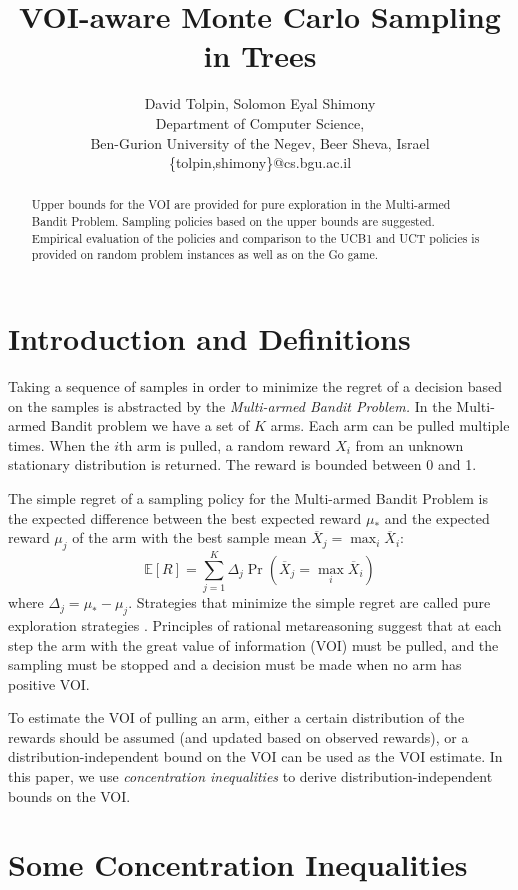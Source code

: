 \documentclass{article}
\title{VOI-aware Monte Carlo Sampling in Trees}
\author {David Tolpin, Solomon Eyal Shimony \\
Department of Computer Science, \\
Ben-Gurion University of the Negev, Beer Sheva, Israel \\
\{tolpin,shimony\}@cs.bgu.ac.il}
\newcommand {\IE} {\ensuremath {\mathbb{E}}}
\begin{document}
\maketitle

\begin{abstract}
Upper bounds for the VOI are provided for pure exploration in the
Multi-armed Bandit Problem. Sampling policies based on the upper
bounds are suggested. Empirical evaluation of the policies and
comparison to the UCB1 and UCT policies is provided
on random problem instances as well as on the Go game.
\end{abstract}


\section{Introduction and Definitions}

Taking a sequence of samples in order to minimize the
regret of a decision based on the samples is abstracted by the
{\em Multi-armed Bandit Problem.} In the Multi-armed Bandit problem
we have a set of $K$ arms. Each arm can be pulled multiple
times. When the $i$th arm is pulled, a random reward $X_i$ from an
unknown stationary distribution is returned.  The reward is bounded
between 0 and 1.

The simple regret of a sampling policy for the Multi-armed Bandit
Problem is the expected difference between the best expected reward
$\mu_*$ and the expected reward $\mu_j$ of the arm with the best sample mean
$\overline X_j=\max_i\overline X_i$:
\begin{equation}
\label{eqn:simple-regret}
\IE[R]=\sum_{j=1}^K\Delta_j\Pr(\overline X_j=\max_i\overline X_i)
\end{equation}
where $\Delta_j=\mu_*-\mu_j$.
Strategies that minimize the simple regret are called pure exploration
strategies \cite{Bubeck.pure}. Principles of rational metareasoning
\cite{Russell.right} suggest that at each step the arm with the great
value of information (VOI) must be pulled, and the sampling must be
stopped and a decision must be made when no arm has positive VOI. 

To estimate the VOI of pulling an arm, either a certain 
distribution of the rewards should be assumed (and updated based on
observed rewards), or a distribution-independent bound on the VOI can be
used as the VOI estimate. In this paper, we use {\em concentration inequalities}
to derive distribution-independent bounds on the VOI.

\section{Some Concentration Inequalities}
\end{document}
